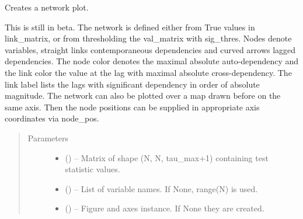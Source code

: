 \documentclass[letterpaper,10pt,english]{sphinxmanual}
\begin{document}
\begin{fulllineitems}
\label{\detokenize{index:tigramite.plotting.plot_graph}}
Creates a network plot.

This is still in beta. The network is defined either from True values in
link\_matrix, or from thresholding the val\_matrix with sig\_thres.  Nodes
denote variables, straight links contemporaneous dependencies and curved
arrows lagged dependencies. The node color denotes the maximal absolute
auto-dependency and the link color the value at the lag with maximal
absolute cross-dependency. The link label lists the lags with significant
dependency in order of absolute magnitude. The network can also be plotted
over a map drawn before on the same axis. Then the node positions can be
supplied in appropriate axis coordinates via node\_pos.
\begin{quote}\begin{description}
\item[{Parameters}] \leavevmode\begin{itemize}
\item {} 
 () -- Matrix of shape (N, N, tau\_max+1) containing test statistic values.

\item {} 
 (\sphinxstyleliteralemphasis{, }\sphinxstyleliteralemphasis{ (}\sphinxstyleliteralemphasis{)}\sphinxstyleliteralemphasis{}) -- List of variable names. If None, range(N) is used.

\item {} 
 (\sphinxstyleliteralemphasis{, }\sphinxstyleliteralemphasis{ (}\sphinxstyleliteralemphasis{)}\sphinxstyleliteralemphasis{}) -- Figure and axes instance. If None they are created.


\end{itemize}
\end{description}
\end{quote}
\end{fulllineitems}
\end{document}
